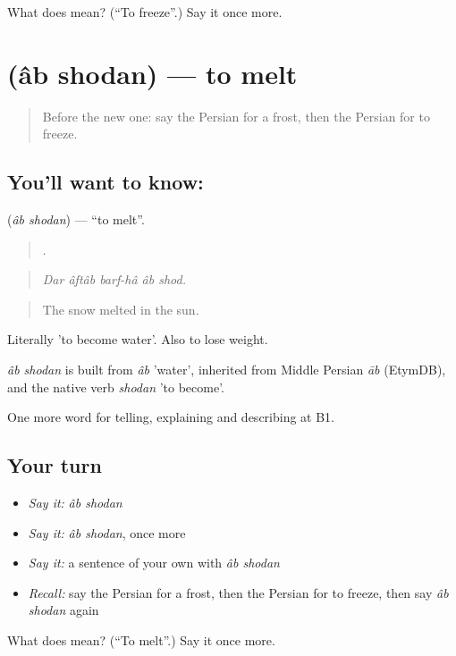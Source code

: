 \begin{tcolorbox}[breakable,colback=teal!4,colframe=teal!35!black,title={Before you move on}]
What does   mean? (\textquotedblleft{}To freeze\textquotedblright{}.) Say it once more.
\end{tcolorbox}
\section[\texorpdfstring{\fa{آب} \fa{شدن} (âb shodan)}{آب شدن (âb shodan)}]{  (âb shodan) — to melt}

\label{lesson:FA-C476-ab-shodan}



\begin{quote}
Before the new one: say the Persian for a frost, then the Persian for to freeze.
\end{quote}

\subsection*{You'll want to know:  }
\textbf{ } (\emph{âb shodan}) — \textquotedblleft{}to melt\textquotedblright{}.

\begin{quote}
    .
\end{quote}

\begin{quote}
\emph{Dar âftâb barf-hâ âb shod.}
\end{quote}

\begin{quote}
The snow melted in the sun.
\end{quote}

Literally 'to become water'. Also to lose weight.

\begin{cousinweb}
\emph{âb shodan} is built from \emph{âb} 'water', inherited from Middle Persian \emph{āb} (EtymDB), and the native verb \emph{shodan} 'to become'.
\end{cousinweb}

\begin{grammarlens}[title={What you've built}]
One more word for telling, explaining and describing at B1.
\end{grammarlens}

\subsection*{Your turn}
\begin{itemize}
\raggedright
  \item \emph{Say it:} \emph{âb shodan}
  \item \emph{Say it:} \emph{âb shodan}, once more
  \item \emph{Say it:} a sentence of your own with \emph{âb shodan}
  \item \emph{Recall:} say the Persian for a frost, then the Persian for to freeze, then say \emph{âb shodan} again
\end{itemize}

\begin{tcolorbox}[breakable,colback=teal!4,colframe=teal!35!black,title={Before you move on}]
What does   mean? (\textquotedblleft{}To melt\textquotedblright{}.) Say it once more.
\end{tcolorbox}
